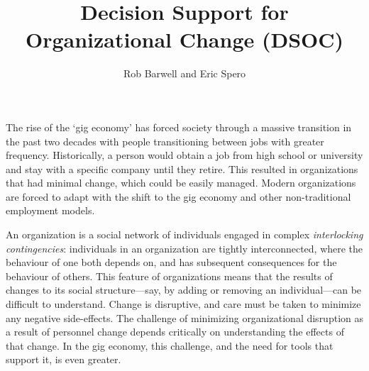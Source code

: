 \documentclass[journal]{vgtc}                %
\title{Decision Support for Organizational Change (DSOC)}
\author{Rob Barwell and Eric Spero}
\begin{document}

\maketitle


The rise of the \lq gig economy\rq{}\cite{de2015rise,friedman2014workers} has forced society through a massive transition in the past two decades with people transitioning between jobs with greater frequency.  Historically, a person would obtain a job from high school or university and stay with a specific company until they retire.  This resulted in organizations that had minimal change, which could be easily managed. Modern organizations are forced to adapt with the shift to the gig economy and other non-traditional employment models.  

An organization is a social network\cite{scott1988social} of individuals engaged in complex \emph{interlocking contingencies}\cite{glenn2006complexity}: individuals in an organization are tightly interconnected, where the behaviour of one both depends on, and has subsequent consequences for the behaviour of others\cite{glenn2006complexity}. This feature of organizations means that the results of changes to its social structure---say, by adding or removing an individual---can be difficult to understand. Change is disruptive, and care must be taken to minimize any negative side-effects. The challenge of minimizing organizational disruption as a result of personnel change depends critically on understanding the effects of that change. In the gig economy, this challenge, and the need for tools that support it, is even greater. 
\end{document}
